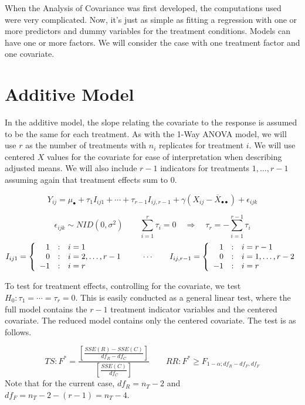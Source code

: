 \documentclass[
]{book}
\begin{document}
When the Analysis of Covariance was first developed, the computations
used were very complicated. Now, it's just as simple as fitting a
regression with one or more predictors and dummy variables for the
treatment conditions. Models can have one or more factors. We will
consider the case with one treatment factor and one covariate.

\section{Additive Model}\label{additive-model}

In the additive model, the slope relating the covariate to the response
is assumed to be the same for each treatment. As with the 1-Way ANOVA
model, we will use \(r\) as the number of treatments with \(n_i\)
replicates for treatment \(i\). We will use centered \(X\) values for
the covariate for ease of interpretation when describing adjusted means.
We will also include \(r-1\) indicators for treatments \(1,\ldots,r-1\)
assuming again that treatment effects sum to 0.

\[
Y_{ij}= \mu_{\bullet} + \tau_1 I_{ij1} + \cdots +
\tau_{r-1}I_{ij,r-1} + 
\gamma \left(X_{ij}-\overline{X}_{\bullet\bullet}\right) +\epsilon_{ijk}
\]

\[
\epsilon_{ijk} \sim NID\left(0,\sigma^2\right) \qquad
\sum_{i=1}^r\tau_i=0 \quad \Rightarrow \quad \tau_r=-\sum_{i=1}^{r-1}\tau_i
\] \[
I_{ij1} = 
\left\{ \begin{array}{r@{\quad:\quad}l}
    1 & i=1 \\
    0 & i=2,\ldots,r-1 \\
    -1 & i=r\\
    \end{array} \right.
  \qquad \cdots
   \qquad
I_{ij,r-1} = 
\left\{ \begin{array}{r@{\quad:\quad}l}
    1 & i=r-1 \\
    0 & i=1,\ldots,r-2 \\
    -1 & i=r\\
     \end{array} \right.
\]

To test for treatment effects, controlling for the covariate, we test
\(H_0:\tau_1=\cdots = \tau_r=0\). This is easily conducted as a general
linear test, where the full model contains the \(r-1\) treatment
indicator variables and the centered covariate. The reduced model
contains only the centered covariate. The test is as follows.

\[
TS: F^*=\frac{\left[\frac{SSE(R)-SSE(C)}{df_R-df_C}\right]}{
\left[\frac{SSE(C)}{df_C}\right]
}
\qquad RR:F^*
\geq F_{1-\alpha;df_R-df_F,df_F}
\] Note that for the current case, \(df_R=n_T-2\) and
\(df_F=n_T-2-(r-1)=n_T-4\).
\end{document}
